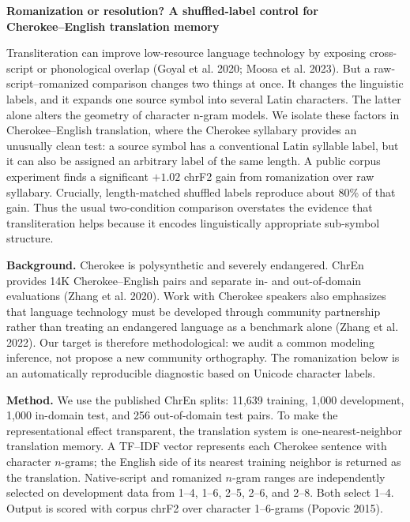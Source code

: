 \documentclass[12pt]{article}
\begin{document}
\begin{center}
{\bfseries Romanization or resolution? A shuffled-label control for\\
Cherokee--English translation memory}
\end{center}
\vspace{-0.65em}

Transliteration can improve low-resource language technology by exposing
cross-script or phonological overlap (Goyal et al. 2020; Moosa et al. 2023).
But a raw-script--romanized comparison changes two things at once. It changes
the linguistic labels, and it expands one source symbol into several Latin
characters. The latter alone alters the geometry of character n-gram models.
We isolate these factors in Cherokee--English translation, where the Cherokee
syllabary provides an unusually clean test: a source symbol has a conventional
Latin syllable label, but it can also be assigned an arbitrary label of the
same length. A public corpus experiment finds a significant $+1.02$ chrF2
gain from romanization over raw syllabary. Crucially, length-matched shuffled
labels reproduce about 80\% of that gain. Thus the usual two-condition
comparison overstates the evidence that transliteration helps because it
encodes linguistically appropriate sub-symbol structure.

\textbf{Background.}
Cherokee is polysynthetic and severely endangered. ChrEn provides 14K
Cherokee--English pairs and separate in- and out-of-domain evaluations
(Zhang et al. 2020). Work with Cherokee speakers also emphasizes that language
technology must be developed through community partnership rather than treating
an endangered language as a benchmark alone (Zhang et al. 2022). Our target is
therefore methodological: we audit a common modeling inference, not propose a
new community orthography. The romanization below is an automatically
reproducible diagnostic based on Unicode character labels.

\textbf{Method.}
We use the published ChrEn splits: 11,639 training, 1,000 development, 1,000
in-domain test, and 256 out-of-domain test pairs. To make the representational
effect transparent, the translation system is one-nearest-neighbor translation
memory. A TF--IDF vector represents each Cherokee sentence with character
$n$-grams; the English side of its nearest training neighbor is returned as the
translation. Native-script and romanized $n$-gram ranges are independently
selected on development data from 1--4, 1--6, 2--5, 2--6, and 2--8. Both select
1--4. Output is scored with corpus chrF2 over character 1--6-grams
(Popovic 2015).
\end{document}
